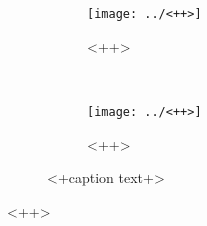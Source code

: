         \begin{figure}[htb]
            \centering
            \begin{subfigure}[b]{0.45\textwidth}
                \texttt{[image: ../<++>]}
                \label{fig:<++>}
                \caption{<++>}
            \end{subfigure}
            ~
            \begin{subfigure}[b]{0.45\textwidth}
                \texttt{[image: ../<++>]}
                \label{fig:<++>}
                \caption{<++>}
            \end{subfigure}
            \caption{<+caption text+>}
            \label{fig:<+label+>}
        \end{figure}<++>
